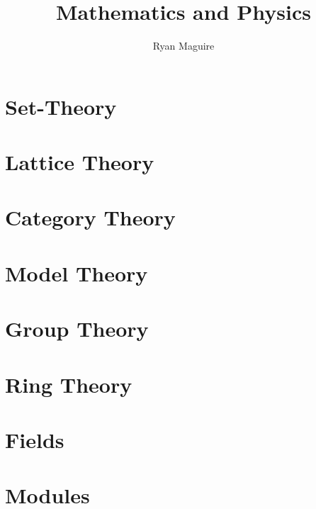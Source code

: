\documentclass[oneside]{book}                                                  %
\title{Mathematics and Physics}                                                %
\author{Ryan Maguire}                                                          %
\date{\vspace{-5ex}}                                                           %
\newcommand*{\TOPPATH}{books}
\newcommand*{\PATH}{\TOPPATH/}
\newcounter{endpage}
\begin{document}
    \maketitle
    \tableofcontents
    \listoffigures
    \listoftables
    \clearpage
        \renewcommand{\PATH}{\TOPPATH/Foundations}
        \part{Set-Theory}
            
        \part{Lattice Theory}
            
        \part{Category Theory}
            
        \part{Model Theory}
            
    \clearpage

    \setcounter{endpage}{\thepage}
        \label{book:Algebra}%
        \renewcommand{\PATH}{\TOPPATH/Algebra}
        \setcounter{page}{\value{endpage}}
        \part{Group Theory}
            
        \part{Ring Theory}
            
        \part{Fields}
            
        \part{Modules}
           
    \clearpage
\end{document}
